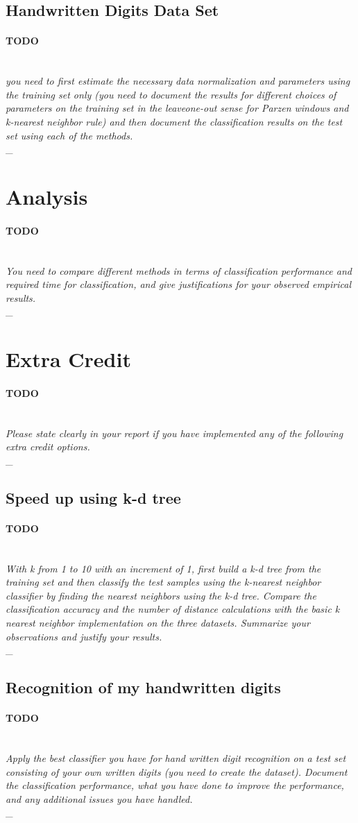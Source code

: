 \documentclass{article}
\newcommand{\outline}[2]{\paragraph{\textsc{#1}}\hrulefill~\\{\small\it #2}\\\_\hrulefill~\\}
\newcommand{\todo}[1]{\outline{\large TODO}{#1}}
\begin{document}
\subsection{Handwritten Digits Data Set}
\todo{you need to first estimate the necessary data normalization and parameters using the training set only (you need to document the results for different choices of parameters on the training set in the leaveone-out sense for Parzen windows and k-nearest neighbor rule) and then document the classification results on
the test set using each of the methods.}

\section{Analysis}
\todo{You need to compare different methods in terms of classification performance and required time for classification, and give justifications for your observed empirical results.}


\section{Extra Credit}
\todo{Please state clearly in your report if you have implemented any of the following extra
credit options.}

\subsection{Speed up using k-d tree}
\todo{With k from 1 to 10 with an increment of 1, first build a k-d tree from the training set and then classify the test samples using the k-nearest neighbor classifier by finding the nearest neighbors using the k-d tree. Compare the classification accuracy and the number of distance calculations with the basic k nearest neighbor implementation on the three datasets. Summarize your observations and justify your results.}

\subsection{Recognition of my handwritten digits}
\todo{Apply the best classifier you have for hand written digit recognition on a test set consisting of your own written digits (you need to create the dataset). Document the classification performance, what you have done to improve the performance, and any additional issues you have handled.}
\end{document}
